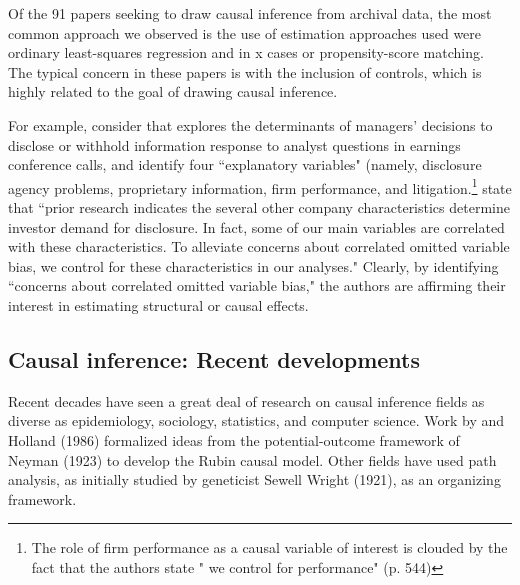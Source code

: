 \documentclass[11pt]{amsart}
\begin{document}
Of the 91 papers seeking to draw causal inference from archival data, the  most common approach we observed is the use of estimation approaches used were ordinary least-squares regression and in x cases or propensity-score matching. The typical concern in these papers is with the inclusion of controls, which is highly related to the goal of drawing causal inference.


For example, consider \cite{Hollander:2010jg} that explores the determinants of managers' decisions to disclose or withhold information response to analyst questions in earnings conference calls, and identify four ``explanatory variables" (namely, disclosure agency problems, proprietary information, firm performance, and litigation.\footnote {The role of firm performance as a causal variable of interest is clouded by the fact that the authors state " we control for performance" (p. 544)} \cite{Hollander:2010jg} state that ``prior research indicates the several other company characteristics determine investor demand for disclosure. In fact, some of our main variables are correlated with these characteristics.
To alleviate concerns about correlated omitted variable bias, we control for these characteristics in our analyses."
Clearly, by identifying ``concerns about correlated omitted variable bias," the authors are affirming their interest in estimating structural or causal effects.

\subsection{Causal inference: Recent developments}



Recent decades have seen a great deal of research on causal inference fields as diverse as epidemiology, sociology, statistics, and computer science. 
Work by \citet{Rubin:1974im,Rubin:1977dv} and Holland (1986) formalized ideas from the potential-outcome framework of Neyman (1923) to develop the Rubin causal model. %
Other fields have used path analysis, as initially studied by geneticist Sewell Wright (1921), as an organizing framework.
\end{document}
